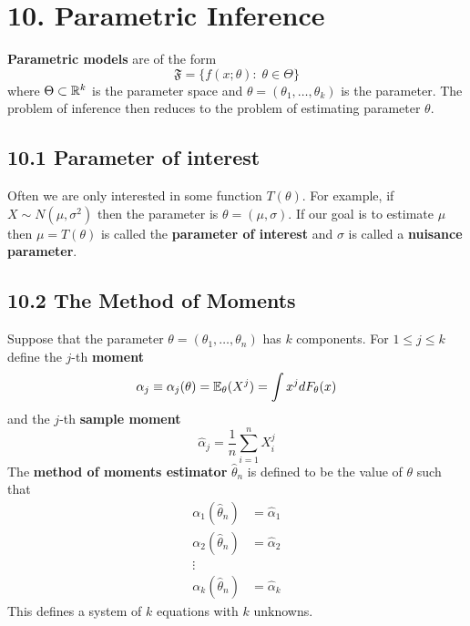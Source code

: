 \section*{10. Parametric Inference}\label{parametric-inference}
\textbf{Parametric models} are of the form
\[
\mathfrak{F} = \bigg\{ f(x; \theta) : \; \theta \in \Theta \bigg\}
\]
where \(\Theta \subset \mathbb{R}^{k}\) is the parameter space and
\(\theta = (\theta_{1}, \dots, \theta_{k})\) is the parameter. The problem
of inference then reduces to the problem of estimating parameter
\(\theta\).

\subsection*{10.1 Parameter of interest}\label{parameter-of-interest}
Often we are only interested in some function \(T(\theta)\). For
example, if \(X \sim N(\mu, \sigma^{2})\) then the parameter is
\(\theta = (\mu, \sigma)\). If our goal is to estimate \(\mu\) then
\(\mu = T(\theta)\) is called the \textbf{parameter of interest} and
\(\sigma\) is called a \textbf{nuisance parameter}.

\subsection*{10.2 The Method of Moments}\label{the-method-of-moments}
Suppose that the parameter \(\theta = (\theta_{1}, \dots, \theta_{n})\) has
\(k\) components. For \(1 \leq j \leq k\) define the \(j\)-th
\textbf{moment}
\[
\alpha_{j} \equiv \alpha_{j}(\theta) = \operatorname{\mathbb{E}}_{\theta}(X^{j}) = \int x^{j} dF_\theta(x)
\]
and the \(j\)-th \textbf{sample moment}
\[
\hat{\alpha}_{j} = \frac{1}{n} \sum_{i=1}^{n} X_{i}^{j}
\]
The \textbf{method of moments estimator} \(\hat{\theta}_{n}\) is defined
to be the value of \(\theta\) such that
\begin{align*}
\alpha_{1}(\hat{\theta}_{n}) &= \hat{\alpha}_{1} \\
\alpha_{2}(\hat{\theta}_{n}) &= \hat{\alpha}_{2} \\
\vdots \\
\alpha_{k}(\hat{\theta}_{n}) &= \hat{\alpha}_{k}  
\end{align*}
This defines a system of \(k\) equations with \(k\) unknowns.

